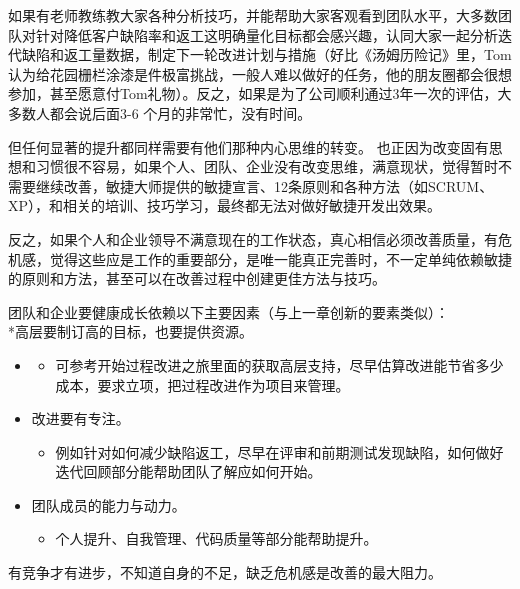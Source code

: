 
如果有老师教练教大家各种分析技巧，并能帮助大家客观看到团队水平，大多数团队对针对降低客户缺陷率和返工这明确量化目标都会感兴趣，认同大家一起分析迭代缺陷和返工量数据，制定下一轮改进计划与措施（好比《汤姆历险记》里，Tom认为给花园栅栏涂漆是件极富挑战，一般人难以做好的任务，他的朋友圈都会很想参加，甚至愿意付Tom礼物）。反之，如果是为了公司顺利通过3年一次的评估，大多数人都会说后面3-6
个月的非常忙，没有时间。

但任何显著的提升都同样需要有他们那种内心思维的转变。
也正因为改变固有思想和习惯很不容易，如果个人、团队、企业没有改变思维，满意现状，觉得暂时不需要继续改善，敏捷大师提供的敏捷宣言、12条原则和各种方法（如SCRUM、XP），和相关的培训、技巧学习，最终都无法对做好敏捷开发出效果。

反之，如果个人和企业领导不满意现在的工作状态，真心相信必须改善质量，有危机感，觉得这些应是工作的重要部分，是唯一能真正完善时，不一定单纯依赖敏捷的原则和方法，甚至可以在改善过程中创建更佳方法与技巧。

团队和企业要健康成长依赖以下主要因素（与上一章创新的要素类似）：\\
*高层要制订高的目标，也要提供资源。

\begin{itemize}
\item
  \begin{itemize}
  \tightlist
  \item
    可参考开始过程改进之旅里面的获取高层支持，尽早估算改进能节省多少成本，要求立项，把过程改进作为项目来管理。
  \end{itemize}
\item
  改进要有专注。

  \begin{itemize}
  \tightlist
  \item
    例如针对如何减少缺陷返工，尽早在评审和前期测试发现缺陷，如何做好迭代回顾部分能帮助团队了解应如何开始。
  \end{itemize}
\item
  团队成员的能力与动力。

  \begin{itemize}
  \tightlist
  \item
    个人提升、自我管理、代码质量等部分能帮助提升。
  \end{itemize}
\end{itemize}

有竞争才有进步，不知道自身的不足，缺乏危机感是改善的最大阻力。

